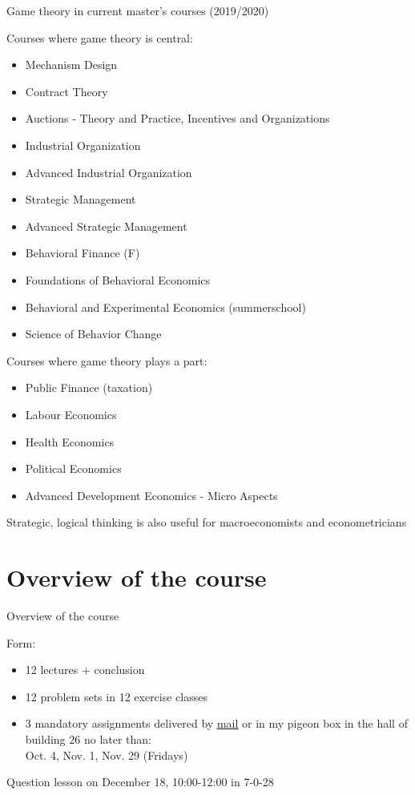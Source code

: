 \begin{frame}{Game theory in current master's courses (2019/2020)}
\begin{multicols}{2}
Courses where game theory is central:
\begin{itemize}
  \item Mechanism Design \item Contract Theory \item Auctions - Theory  and Practice, Incentives and Organizations \item Industrial Organization \item Advanced Industrial Organization  \item Strategic Management \item Advanced Strategic Management \item Behavioral Finance (F) \item Foundations of Behavioral Economics \item Behavioral and Experimental Economics (summerschool) \item Science of Behavior Change
\end{itemize}
\vfill\null \columnbreak
Courses where game theory plays a part:
\begin{itemize}
  \item Public Finance (taxation) \item Labour Economics \item Health Economics \item Political Economics \item Advanced Development Economics - Micro Aspects
\end{itemize}
Strategic, logical thinking is also useful for macroeconomists and econometricians
\end{multicols}
\end{frame}


\section{Overview of the course}

\begin{frame}{Overview of the course}
\begin{multicols}{2}
Form:
  \begin{itemize}
    \item 12 lectures + conclusion
    \item 12 problem sets in 12 exercise classes
    \item 3 mandatory assignments delivered by \href{mailto:thor.noe@econ.ku.dk}{mail} or in my pigeon box in the hall of building 26 no later than: \\
    Oct. 4, Nov. 1, Nov. 29 (Fridays)
  \end{itemize}
Question lesson on December 18, 10:00-12:00 in 7-0-28
\vfill\null \columnbreak
\vfill\null
\end{multicols}
\end{frame}

